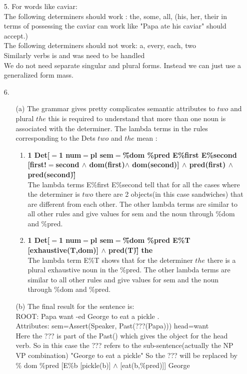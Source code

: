 \documentclass{article}
\begin{document}
\begin{enumerate}
\begin{enumerate}
    \end{enumerate}
    \item[5.]
    For words like caviar: 
    \\The following determiners should work : the, some, all, (his, her, their in terms of possessing the caviar can work like "Papa ate his caviar" should accept.)
    \\The following determiners should not work: a, every, each, two
    \\Similarly verbs is and was need to be handled
    \\We do not need separate singular and plural forms. Instead we can just use a generalized form mass.
    \item[6.]
    \begin{enumerate}
        \item[(a)] 
        The grammar gives pretty complicates semantic attributes to $two$ and plural $the$ this is required to understand that more than one noun is associated with the determiner.
        The lambda terms in the rules corresponding to the Dets $two$ and $the$ mean :
        \begin{enumerate}
        \item \textbf{ 1 Det[$=$1 num$=$pl sem$=$\"\%dom \%pred E\%first E\%second [first!$=$second $\wedge$ dom(first)$\wedge$ dom(second)] $\wedge$ pred(first) $\wedge$ pred(second)\"] }
        \\
        The lambda terms E\%first E\%second tell that for all the cases where the determiner is $two$ there are 2 objects(in this case sandwiches) that are different from each other. The other lambda terms are similar to all other rules and give values for sem and the noun through \%dom and \%pred.
        \item \textbf{1 Det[$=$1 num$=$pl sem$=$\"\%dom \%pred E\%T [exhaustive(T,dom)] $\wedge$ pred(T)\"] the}
        \\
        The lambda term E\%T shows that for the determiner $the$ there is a plural exhaustive noun in the \%pred. The other lambda terms are similar to all other rules and give values for sem and the noun through \%dom and \%pred.
        \end{enumerate}
        \item[(b)] The final result for the sentence is:
        \\ROOT: Papa want -ed George to eat a pickle . 
\\Attributes: sem=Assert(Speaker, Past(???(Papa))) head=want
\\Here the ??? is part of the Past() which gives the object for the head verb. So in this case the ??? refers to the sub-sentence(actually the NP VP combination) "George to eat a pickle" So the ??? will be replaced by \% dom \%pred [E\%b [pickle(b)] $\wedge$ [eat(b,\%pred)]] George
    \end{enumerate}
\end{enumerate}
\end{document}
